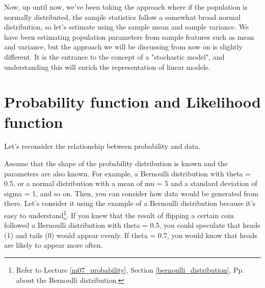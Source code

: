 \documentclass{ltjsbook}
\begin{document}
Now, up until now, we've been taking the approach where if the population is normally distributed, the sample statistics follow a somewhat broad normal distribution, so let's estimate using the sample mean and sample variance. We have been estimating population parameters from sample features such as mean and variance, but the approach we will be discussing from now on is slightly different. It is the entrance to the concept of a "stochastic model", and understanding this will enrich the representation of linear models.

\section{Probability function and Likelihood function}
Let's reconsider the relationship between probability and data.

Assume that the shape of the probability distribution is known and the parameters are also known. For example, a Bernoulli distribution with theta = 0.5, or a normal distribution with a mean of mu = 5 and a standard deviation of sigma = 1, and so on. Then, you can consider how data would be generated from there. Let's consider it using the example of a Bernoulli distribution because it's easy to understand\footnote{Refer to Lecture \ref{m07_probability}, Section \ref{bernoulli_distribution}, Pp. \pageref{bernoulli_distribution} about the Bernoulli distribution.}. If you knew that the result of flipping a certain coin followed a Bernoulli distribution with theta = 0.5, you could speculate that heads (1) and tails (0) would appear evenly. If theta = 0.7, you would know that heads are likely to appear more often.
\end{document}
